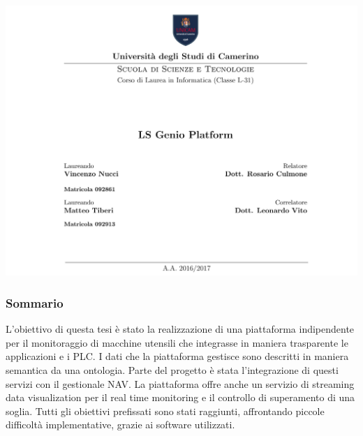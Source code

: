 \documentclass{beamer}
\date{}
\begin{document}
	
	\begin{frame}
	\centering
	\includegraphics[scale=0.25]{images/frontespizio-beamer.png}\par
\end{frame}

\begin{frame}
	\frametitle{Sommario}
	L'obiettivo di questa tesi è stato la realizzazione di una piattaforma indipendente per il monitoraggio di macchine utensili che integrasse in maniera trasparente le applicazioni e i PLC. I dati che la piattaforma gestisce sono descritti in maniera semantica da una ontologia. Parte del progetto è stata l'integrazione di questi servizi con il gestionale NAV. La piattaforma offre anche un servizio di streaming data visualization per il real time monitoring e il controllo di superamento di una soglia. Tutti gli obiettivi prefissati sono stati raggiunti, affrontando piccole difficoltà implementative, grazie ai software utilizzati.
\end{frame}
\end{document}
